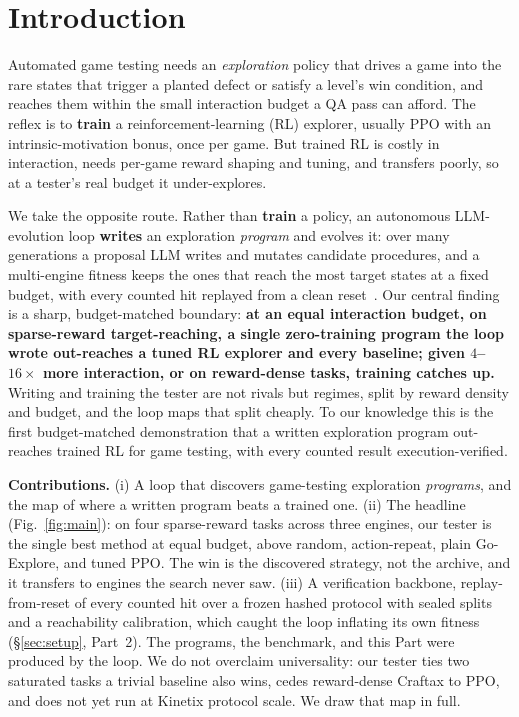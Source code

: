 \documentclass[11pt]{article}
\begin{document}
\section{Introduction}
\label{sec:intro}
Automated game testing needs an \emph{exploration} policy that drives a game into the rare states that trigger a planted
defect or satisfy a level's win condition, and reaches them within the small interaction budget a QA pass can afford. The
reflex is to \textbf{train} a reinforcement-learning (RL) explorer, usually PPO with an intrinsic-motivation bonus, once
per game. But trained RL is costly in interaction, needs per-game reward shaping and tuning, and transfers poorly, so at a
tester's real budget it under-explores.

We take the opposite route. Rather than \textbf{train} a policy, an autonomous LLM-evolution loop \textbf{writes} an
exploration \emph{program} and evolves it: over many generations a proposal LLM writes and mutates candidate procedures,
and a multi-engine fitness keeps the ones that reach the most target states at a fixed budget, with every counted hit
replayed from a clean reset~\citep{funsearch}. Our central finding is a sharp, budget-matched boundary:
\textbf{at an equal interaction budget, on sparse-reward target-reaching, a single zero-training program the loop wrote
out-reaches a tuned RL explorer and every baseline; given $4$--$16\times$ more interaction, or on reward-dense tasks,
training catches up.} Writing and training the tester are not rivals but regimes, split by reward density and budget, and
the loop maps that split cheaply. To our knowledge this is the first budget-matched demonstration that a written
exploration program out-reaches trained RL for game testing, with every counted result execution-verified.

\textbf{Contributions.} (i) A loop that discovers game-testing exploration \emph{programs}, and the map of where a written
program beats a trained one. (ii) The headline (Fig.~\ref{fig:main}): on four sparse-reward tasks across three engines, our
tester is the single best method at equal budget, above random, action-repeat, plain Go-Explore, and tuned PPO. The win is
the discovered strategy, not the archive, and it transfers to engines the search never saw. (iii) A verification backbone,
replay-from-reset of every counted hit over a frozen hashed protocol with sealed splits and a reachability calibration,
which caught the loop inflating its own fitness (\S\ref{sec:setup}, Part~2). The programs, the benchmark, and this Part
were produced by the loop. We do not overclaim universality: our tester ties two saturated tasks a trivial baseline also
wins, cedes reward-dense Craftax to PPO, and does not yet run at Kinetix protocol scale. We draw that map in full.
\end{document}
